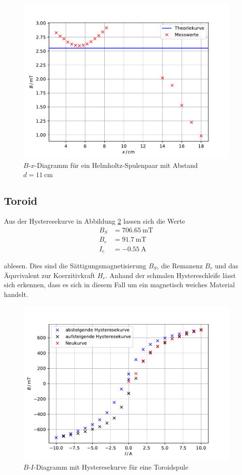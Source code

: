 \begin{figure}[H]
  \centering
  \includegraphics[width=\textwidth]{Plots/helm3.pdf}
  \caption{$B$-$x$-Diagramm für ein Helmholtz-Spulenpaar mit Abstand $d = \SI{11}{\centi \meter}$}
  \label{fig:helm3}
\end{figure}


\subsection{Toroid \label{sec:hys}}

Aus der Hysteresekurve in Abbildung \ref{fig:torus} lassen sich die Werte
\begin{align*}
  B_S &= \SI{706,65}{\milli \tesla} \\
  B_r &= \SI{91,7}{\milli \tesla} \\
  I_c &= \SI{-0,55}{\A}
\end{align*}

ablesen.
Dies sind die Sättigungsmagnetisierung $B_S$, die Remanenz $B_r$ und das Äquvivalent zur Koerzitivkraft $H_c$.
Anhand der schmalen Hystereschleife lässt sich erkennen, dass es sich in diesem Fall um ein magnetisch weiches
Material handelt.
\begin{figure}[H]
  \centering
  \includegraphics[width=\textwidth]{Plots/torus.pdf}
  \caption{$B$-$I$-Diagramm mit Hysteresekurve für eine Toroidspule}
  \label{fig:torus}
\end{figure}
